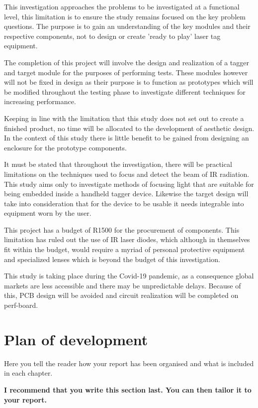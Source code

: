 This investigation approaches the problems to be investigated at a functional level, this limitation is to ensure the study remains focused on the key problem questions. The purpose is to gain an understanding of the key modules and their respective components, not to design or create 'ready to play' laser tag equipment.

The completion of this project will involve the design and realization of a tagger and target module for the purposes of performing tests. These modules however will not be fixed in design as their purpose is to function as prototypes which will be modified throughout the testing phase to investigate different techniques for increasing performance.

Keeping in line with the limitation that this study does not set out to create a finished product, no time will be allocated to the development of aesthetic design. In the context of this study there is little benefit to be gained from designing an enclosure for the prototype components.

It must be stated that throughout the investigation, there will be practical limitations on the techniques used to focus and detect the beam of IR radiation. This study aims only to investigate methods of focusing light that are suitable for being embedded inside a handheld tagger device. Likewise the target design will take into consideration that for the device to be usable it needs integrable into equipment worn by the user.

This project has a budget of R1500 for the procurement of components. This limitation has ruled out the use of IR laser diodes, which although in themselves fit within the budget, would require a myriad of personal protective equipment and specialized lenses which is beyond the budget of this investigation.

This study is taking place during the Covid-19 pandemic, as a consequence global markets are less accessible and there may be unpredictable delays. Because of this, PCB design will be avoided and circuit realization will be completed on perf-board.



\section{Plan of development}
Here you tell the reader how your report has been organised and what is included in each
chapter.

{\bf I recommend that you write this section last. You can then tailor it to your report.}

